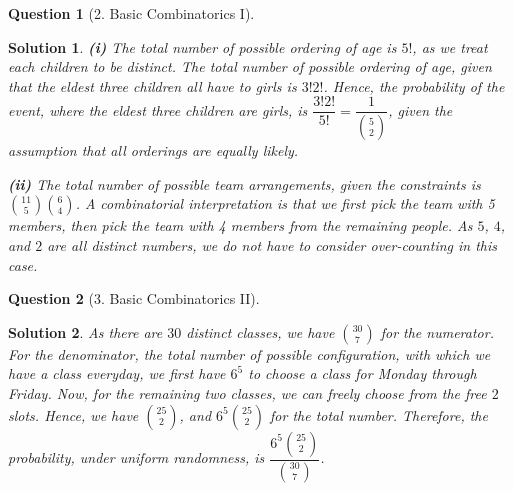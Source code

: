 \documentclass{article} %
\theoremstyle{quest}
\newtheorem*{question}{Question}
\newtheorem*{solution}{Solution}
\begin{document}
\bigskip

\begin{question}[2. Basic Combinatorics I]
\end{question}
\begin{solution}

\textbf{(i)} The total number of possible ordering of age is $5!$, as we treat each children to be distinct.
The total number of possible ordering of age, given that the eldest three children all have to girls
is $3!2!$. Hence, the probability of the event, where the eldest three children are girls, is 
$\dfrac{3!2!}{5!} = \dfrac{1}{\binom{5}{2}}$, given the assumption that all orderings are equally likely.

\bigskip

\textbf{(ii)}
The total number of possible team arrangements, given the constraints is $\binom{11}{5} \binom{6}{4}$. A 
combinatorial interpretation is that we first pick the team with 5 members, then pick the team with 4 members
from the remaining people. As $5$, $4$, and $2$ are all distinct numbers, we do not have to consider
over-counting in this case.

\end{solution}

\pagebreak

\begin{question}[3. Basic Combinatorics II]
\end{question}

\begin{solution}
As there are $30$ distinct classes, we have $\binom{30}{7}$ for the numerator. For the denominator,
the total number of possible configuration, with which we have a class everyday,
we first have $6^5$ to choose a class for Monday through Friday. Now, for the remaining two classes,
we can freely choose from the free $2$ slots. Hence, we have $\binom{25}{2}$, and $6^5 \binom{25}{2}$
for the total number. Therefore, the probability, under uniform randomness, is $\dfrac{6^5
\binom{25}{2}}{\binom{30}{7}}$. 
\end{solution}

\bigskip
\end{document}
